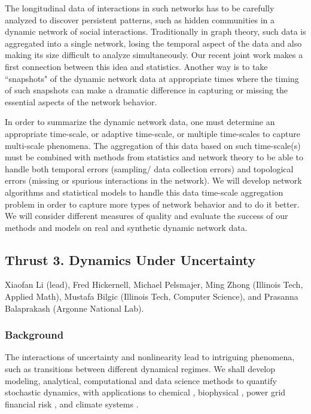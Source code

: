 \documentclass[11pt]{NSFamsart}
\begin{document}
The longitudinal data of interactions in such networks has to be carefully analyzed to discover persistent patterns, such as hidden communities in a dynamic network of social interactions. Traditionally in graph theory, such data is aggregated into a single network, losing the temporal aspect of the data and also making its size difficult to analyze simultaneously. Our recent joint work \cite{tergms} makes a first connection between this idea and statistics. Another way is to take ``snapshots" of the dynamic network data at appropriate times where the timing of such snapshots can make a dramatic difference in capturing or missing the essential aspects of the network behavior. 

In order to summarize the dynamic network data, one must determine an appropriate time-scale, or adaptive time-scale, or multiple time-scales to capture multi-scale phenomena. The aggregation of this data based on such time-scale(s) must be combined with methods from statistics and network theory to be able to handle both temporal errors (sampling/ data collection errors) and topological errors (missing or spurious interactions in the network).  We will develop network algorithms and statistical models to handle this data time-scale aggregation problem in order to capture more types of network behavior and to do it better.  We will  consider different measures of quality and evaluate the success of our methods and models on  real and synthetic dynamic network data.






\subsection*{Thrust 3. Dynamics  Under Uncertainty } 
Xiaofan Li (lead), Fred Hickernell, Michael Pelsmajer, Ming Zhong (Illinois Tech, Applied Math), Mustafa Bilgic (Illinois Tech, Computer Science),  and Prasanna Balaprakash (Argonne National Lab). 

\subsubsection*{Background} The interactions of uncertainty and nonlinearity lead to intriguing phenomena, such as  transitions between  different dynamical regimes. We shall develop modeling, analytical, computational and data science  methods to quantify stochastic dynamics, with applications to chemical \cite{agaoglou_chemical_2019}, biophysical \cite{Ruoff2018BiologicalCR}, power grid \cite{MEDJROUBI201714} financial risk \cite{DixHaBil20a,Gla03}, and climate systems \cite{Alexandrov2020NonlinearCD, Franzke2017NonlinearAS, Wan2020ADF}. 
 
\end{document}
